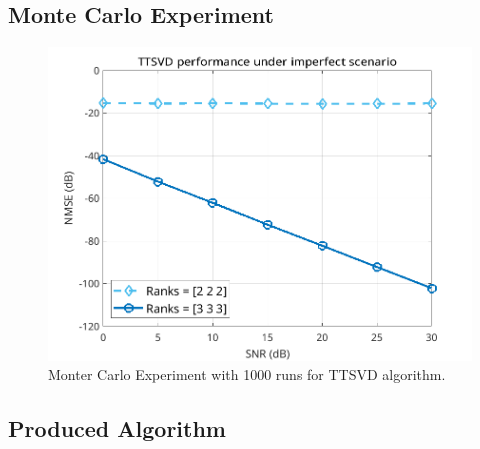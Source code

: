 \documentclass[a4paper,10pt]{article}
\begin{document}
    \subsection*{Monte Carlo Experiment}

    \begin{figure}[ht!]
        \centering 
        \includegraphics[width=0.75\linewidth]{figs/hw13.png} \par 
        \caption{Monter Carlo Experiment with 1000 runs for TTSVD algorithm.}
        \label{fig:hw13} 
    \end{figure}

    \newpage
    \subsection*{Produced Algorithm}
\end{document}
